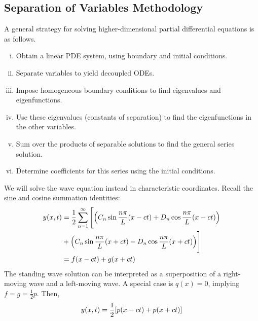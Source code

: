 \subsection{Separation of Variables Methodology}
A general strategy for solving higher-dimensional partial differential equations is as follows.
\begin{enumerate}[(i)]
	\item Obtain a linear PDE system, using boundary and initial conditions.
	\item Separate variables to yield decoupled ODEs.
	\item Impose homogeneous boundary conditions to find eigenvalues and eigenfunctions.
	\item Use these eigenvalues (constants of separation) to find the eigenfunctions in the other variables.
	\item Sum over the products of separable solutions to find the general series solution.
	\item Determine coefficients for this series using the initial conditions.
\end{enumerate}
\begin{example}
	We will solve the wave equation instead in characteristic coordinates.
	Recall the sine and cosine summation identities:
	\begin{align*}
		y(x,t) &= \frac{1}{2} \sum_{n=1}^\infty \Bigg[ \qty(C_n \sin \frac{n \pi}{L}(x-ct) + D_n \cos \frac{n \pi}{L}(x-ct)) \\&
		+ \qty(C_n \sin \frac{n \pi}{L}(x+ct) - D_n \cos \frac{n \pi}{L}(x+ct)) \Bigg] \\
		&= f(x-ct) + g(x+ct)
	\end{align*}
	The standing wave solution can be interpreted as a superposition of a right-moving wave and a left-moving wave.
	A special case is \( q(x) = 0 \), implying \( f = g = \frac{1}{2} p \).
	Then,
	\[
		y(x,t) = \frac{1}{2}\qty[p(x-ct) + p(x+ct)]
	\]
\end{example}
